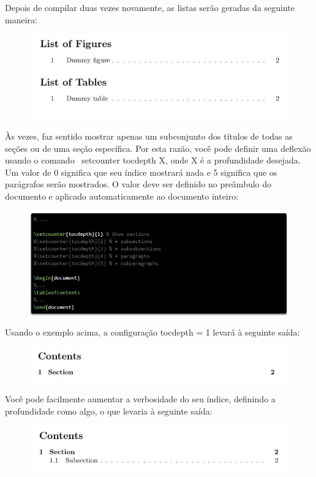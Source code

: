 \documentclass[12pt]{article}
\begin{document}
			
			Depois de compilar duas vezes novamente, as listas serão geradas da seguinte maneira:
			\begin{figure} [h]
				\centering
				\includegraphics[scale=0.9]{29.JPG}
			\end{figure}
			\pagebreak
			
			Às vezes, faz sentido mostrar apenas um subconjunto dos títulos de todas as seções ou de uma seção específica. Por esta razão, você pode definir uma deflexão usando o comando \ setcounter {tocdepth} {X}, onde X é a profundidade desejada. Um valor de 0 significa que seu índice mostrará nada e 5 significa que os parágrafos serão mostrados. O valor deve ser definido no preâmbulo do documento e aplicado automaticamente ao documento inteiro:
			\begin{figure} [h]
				\centering
				\includegraphics[scale=0.9]{30.JPG}
			\end{figure}
			
			Usando o exemplo acima, a configuração tocdepth = 1 levará à seguinte saída:
			\begin{figure} [h]
				\centering
				\includegraphics[scale=0.9]{31.JPG}
			\end{figure}
			\pagebreak
			
			Você pode facilmente aumentar a verbosidade do seu índice, definindo a profundidade como algo, o que levaria à seguinte saída:
			\begin{figure} [h]
				\centering
				\includegraphics[scale=0.9]{32.JPG}
			\end{figure}
			
\end{document}
